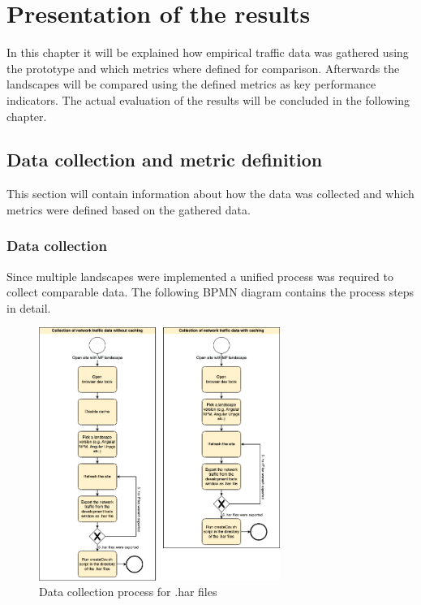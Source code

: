 \chapter{Presentation of the results} %
\label{Chapter6}


In this chapter it will be explained how empirical traffic data was gathered using the prototype and which metrics where defined for comparison.
Afterwards the landscapes will be compared using the defined metrics as key performance indicators. The actual evaluation of the results will be concluded in the following chapter.

\section{Data collection and metric definition} 

This section will contain information about how the data was collected and which metrics were defined based on the gathered data.

\subsection{Data collection}

Since multiple landscapes were implemented a unified process was required to collect comparable data. The following BPMN diagram contains the process steps in detail.

\begin{figure}[!h]
	\centering
	\includegraphics[width=0.7\textwidth]{Figures/Data_Collection_Process_har.drawio.png}
	\caption{Data collection process for .har files}
	\label{fig:data_collection_process_har}
\end{figure}

